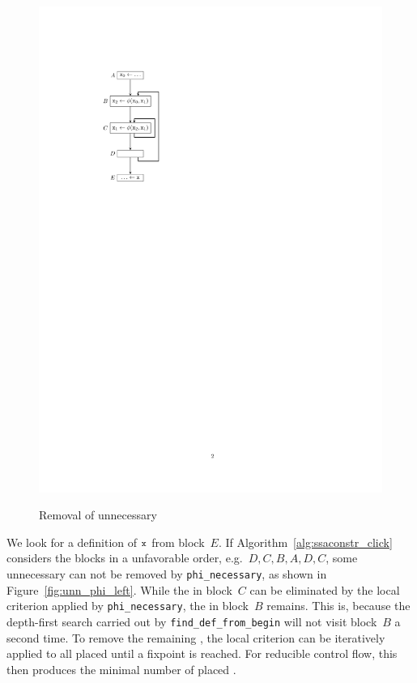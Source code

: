 \begin{figure}[htbp]
\begin{center}
{			\includegraphics{phi_opt_unn.pdf}
		}
	\end{center}
	\caption{Removal of unnecessary \phifuns}
	\label{fig:phiopt}
\end{figure}
We look for a definition of $\mathtt{x}$ from block~$E$.
If Algorithm~\ref{alg:ssaconstr_click} considers the blocks in a unfavorable order, e.g.~$D,C,B,A,D,C$, some unnecessary \phifuns can not be removed by \verb|phi_necessary|, as shown in Figure~\ref{fig:unn_phi_left}.
While the \phifun in block~$C$ can be eliminated by the local criterion applied by \verb|phi_necessary|, the \phifun in block~$B$ remains. 
This is, because the depth-first search carried out by \verb|find_def_from_begin| will not visit block~$B$ a second time.
To remove the remaining \phifuns, the local criterion can be iteratively applied to all placed \phifuns until a fixpoint is reached. 
For reducible control flow, this then produces the minimal number of placed \phifuns. 

